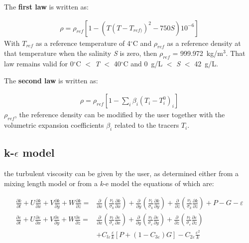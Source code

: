 The \textbf{first law} is written as:

\begin{align}
\rho =\rho _{ref} \left[1-\left(T\left(T-T_{ref)} \right)^{2} -750S\right)10^{-6} \right]
\end{align}
With $T_{ref} $ as a reference temperature of 4${}^\circ$C and $\rho _{ref} $
as a reference density at that temperature when the salinity \textit{S} is
zero, then $\rho _{ref} $ = 999.972~kg/m${}^{3}$. That law remains valid for
0${}^\circ$C $<$ \textit{T} $<$ 40${}^\circ$C and 0~g/L $<$ \textit{S} $<$
42~g/L.

The \textbf{second law} is written as:

\begin{align}
\rho =\rho _{ref} \left[1-\sum _{i}\beta _{i} \left(T_{i} -T_{i}^{0} \right)_{i}  \right]
\end{align}
$\rho _{ref}$,
the reference density can be modified by the user together with the volumetric
expansion coefficients $\beta _{i}$ related to the tracers $T_{i}$.

\subsection{k-$\epsilon$ model}

the turbulent viscosity can be given by the user, as determined either from a
mixing length model or from a \textit{k}-e model the equations of which are:

\begin{subequations}
\begin{align}
\frac{\partial k}{\partial t}
 + U\frac{\partial k}{\partial x} + V\frac{\partial k}{\partial y}
 + W\frac{\partial k}{\partial z} =&
\frac{\partial }{\partial x}
\left(\frac{\nu _{t} }{\sigma _{k} } \frac{\partial k}{\partial x} \right)
 + \frac{\partial }{\partial y}
\left(\frac{\nu _{t} }{\sigma _{k} } \frac{\partial k}{\partial y} \right)
 + \frac{\partial }{\partial z}
\left(\frac{\nu _{t} }{\sigma _{k} } \frac{\partial k}{\partial z} \right)
 + P -G - \varepsilon
\\
\frac{\partial \varepsilon }{\partial t}
 + U\frac{\partial \varepsilon}{\partial x}
 + V\frac{\partial \varepsilon}{\partial y}
 + W\frac{\partial \varepsilon }{\partial z}
 =& \frac{\partial }{\partial x}
\left(\frac{\nu _{t} }{\sigma _{\varepsilon } } \frac{\partial \varepsilon }{\partial x} \right )
+ \frac{\partial }{\partial y}
\left(\frac{\nu _{t} }{\sigma _{\varepsilon } } \frac{\partial \varepsilon }{\partial y} \right)
 + \frac{\partial }{\partial z}
\left(\frac{\nu _{t} }{\sigma _{\varepsilon } } \frac{\partial \varepsilon }{\partial z} \right)
\\
 &+ C_{l\varepsilon } \frac{\varepsilon }{k}
\left[P+\left(1-C_{3\varepsilon } \right)G\right]
- C_{2\varepsilon } \frac{\varepsilon^{2} }{k}
\end{align}
\end{subequations}

